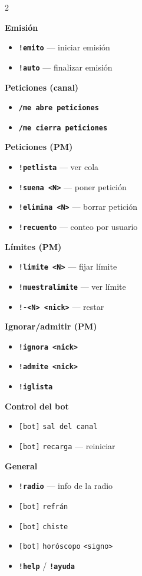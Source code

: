 \documentclass[a4paper,11pt]{article}
\newcommand{\cmd}[1]{\texttt{\color{cmdcolor}\bfseries #1}}
\newcommand{\param}[1]{\texttt{\color{paramcolor}<#1>}}
\renewcommand{\bot}[0]{\texttt{[bot]}}
\begin{document}
\begin{multicols}{2}
\small

\textbf{Emisión}
\begin{itemize}[nosep,leftmargin=1em]
  \item \cmd{!emito} — iniciar emisión
  \item \cmd{!auto} — finalizar emisión
\end{itemize}

\textbf{Peticiones (canal)}
\begin{itemize}[nosep,leftmargin=1em]
  \item \cmd{/me abre peticiones}
  \item \cmd{/me cierra peticiones}
\end{itemize}

\textbf{Peticiones (PM)}
\begin{itemize}[nosep,leftmargin=1em]
  \item \cmd{!petlista} — ver cola
  \item \cmd{!suena \param{N}} — poner petición
  \item \cmd{!elimina \param{N}} — borrar petición
  \item \cmd{!recuento} — conteo por usuario
\end{itemize}

\textbf{Límites (PM)}
\begin{itemize}[nosep,leftmargin=1em]
  \item \cmd{!limite \param{N}} — fijar límite
  \item \cmd{!muestralimite} — ver límite
  \item \cmd{!-\param{N} \param{nick}} — restar
\end{itemize}

\columnbreak

\textbf{Ignorar/admitir (PM)}
\begin{itemize}[nosep,leftmargin=1em]
  \item \cmd{!ignora \param{nick}}
  \item \cmd{!admite \param{nick}}
  \item \cmd{!iglista}
\end{itemize}

\textbf{Control del bot}
\begin{itemize}[nosep,leftmargin=1em]
  \item \bot{} \texttt{sal del canal}
  \item \bot{} \texttt{recarga} — reiniciar
\end{itemize}

\textbf{General}
\begin{itemize}[nosep,leftmargin=1em]
  \item \cmd{!radio} — info de la radio
  \item \bot{} \texttt{refrán}
  \item \bot{} \texttt{chiste}
  \item \bot{} \texttt{horóscopo} \param{signo}
  \item \cmd{!help} / \cmd{!ayuda}
\end{itemize}

\end{multicols}
\end{document}
